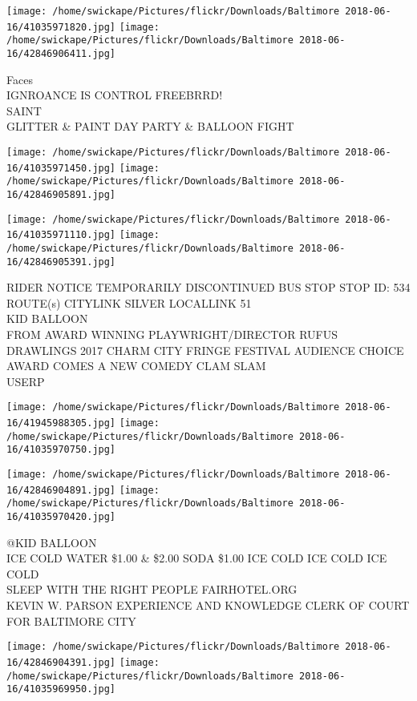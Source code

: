 \documentclass[10pt,letterpaper]{article}
\begin{document}
\texttt{[image: /home/swickape/Pictures/flickr/Downloads/Baltimore 2018-06-16/41035971820.jpg]}
\texttt{[image: /home/swickape/Pictures/flickr/Downloads/Baltimore 2018-06-16/42846906411.jpg]}

Faces\\
IGNROANCE IS CONTROL FREEBRRD!\\
SAINT\\
GLITTER \& PAINT DAY PARTY \& BALLOON FIGHT
\pagebreak

\texttt{[image: /home/swickape/Pictures/flickr/Downloads/Baltimore 2018-06-16/41035971450.jpg]}
\texttt{[image: /home/swickape/Pictures/flickr/Downloads/Baltimore 2018-06-16/42846905891.jpg]}

\texttt{[image: /home/swickape/Pictures/flickr/Downloads/Baltimore 2018-06-16/41035971110.jpg]}
\texttt{[image: /home/swickape/Pictures/flickr/Downloads/Baltimore 2018-06-16/42846905391.jpg]}

RIDER NOTICE TEMPORARILY DISCONTINUED BUS STOP STOP ID: 534 ROUTE(s) CITYLINK SILVER LOCALLINK 51\\
KID BALLOON\\
FROM AWARD WINNING PLAYWRIGHT/DIRECTOR RUFUS DRAWLINGS 2017 CHARM CITY FRINGE FESTIVAL AUDIENCE CHOICE AWARD COMES A NEW COMEDY CLAM SLAM\\
USERP
\pagebreak

\texttt{[image: /home/swickape/Pictures/flickr/Downloads/Baltimore 2018-06-16/41945988305.jpg]}
\texttt{[image: /home/swickape/Pictures/flickr/Downloads/Baltimore 2018-06-16/41035970750.jpg]}

\texttt{[image: /home/swickape/Pictures/flickr/Downloads/Baltimore 2018-06-16/42846904891.jpg]}
\texttt{[image: /home/swickape/Pictures/flickr/Downloads/Baltimore 2018-06-16/41035970420.jpg]}

@KID BALLOON\\
ICE COLD WATER \$1.00 \& \$2.00 SODA \$1.00 ICE COLD ICE COLD ICE COLD\\
SLEEP WITH THE RIGHT PEOPLE FAIRHOTEL.ORG\\
KEVIN W. PARSON EXPERIENCE AND KNOWLEDGE CLERK OF COURT FOR BALTIMORE CITY
\pagebreak

\texttt{[image: /home/swickape/Pictures/flickr/Downloads/Baltimore 2018-06-16/42846904391.jpg]}
\texttt{[image: /home/swickape/Pictures/flickr/Downloads/Baltimore 2018-06-16/41035969950.jpg]}
\end{document}

